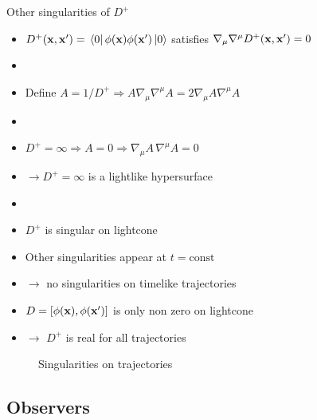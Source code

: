 \documentclass{beamer}
\begin{document}
\begin{frame}{Other singularities of \(D^+\)}
\begin{itemize}
	\item \(D^+(\vb{x},\vb{x}') = \bra*{0}\phi(\vb{x})\phi(\vb{x}')\ket*{0}\) satisfies \(\nabla_\mu\nabla^\mu D^+(\vb{x},\vb{x}') = 0\)
	\item[]
	\item Define \(A = 1/D^+ \Rightarrow A \nabla_\mu\nabla^\mu A = 2 \nabla_\mu A \nabla^\mu A\)
	\item[]	
	\item \(D^+ = \infty \Rightarrow A = 0 \Rightarrow \nabla_\mu A\,\nabla^\mu A = 0\)
	\item[] \(\to D^+ = \infty\) is a lightlike hypersurface
	\item[]	
	\item \(D^+\) is singular on lightcone
\end{itemize}
\end{frame}
\begin{frame}
\begin{itemize}
	\item Other singularities appear at \(t = \mathrm{const}\) 
	\item[] \(\to\) no singularities on timelike trajectories 
	\item \(D = [\phi(\vb{x}),\phi(\vb{x}')]\) is only non zero on lightcone
	\item[] \(\to\) \(D^+\) is real for all trajectories 
\end{itemize}
\begin{figure}
\centering
{}
\caption{Singularities on trajectories}
\end{figure}
\end{frame}

\subsection{Observers}
\end{document}
